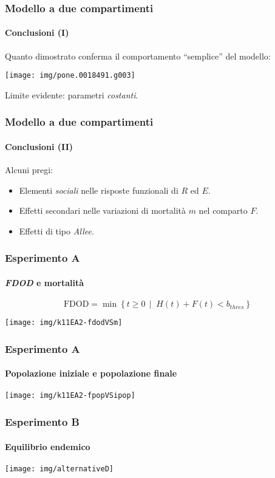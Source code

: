 \documentclass[]{beamer} %
\newcommand{\st}{\,\mid\;}
\begin{document}
\begin{frame}
    \frametitle{Modello a due compartimenti}
    \framesubtitle{Conclusioni (I)}

    Quanto dimostrato conferma il comportamento ``semplice'' del modello:
    \begin{center}
        \texttt{[image: img/pone.0018491.g003]}
    \end{center}

    \pause
    Limite evidente: parametri \emph{costanti}.
\end{frame}

\begin{frame}
    \frametitle{Modello a due compartimenti}
    \framesubtitle{Conclusioni (II)}

    Alcuni pregi:
    \begin{itemize}
        \item \pause Elementi \emph{sociali} nelle risposte funzionali di $R$ ed $E$.
        \item \pause Effetti secondari nelle variazioni di mortalità $m$ nel comparto $F$.
        \item \pause Effetti di tipo \emph{Allee}.
    \end{itemize}
\end{frame}


\begin{frame}
    \frametitle{Esperimento A}
    \framesubtitle{\emph{FDOD} e mortalità}

    $$\text{FDOD} = \min \left\{ t \geq 0 \st H(t) + F(t) < b_{thres} \right\}$$

    \pause
    \begin{center}
        \texttt{[image: img/k11EA2-fdodVSm]}
    \end{center}
\end{frame}

\begin{frame}
    \frametitle{Esperimento A}
    \framesubtitle{Popolazione iniziale e popolazione finale}

    \begin{center}
        \texttt{[image: img/k11EA2-fpopVSipop]}
    \end{center}
\end{frame}

\begin{frame}
    \frametitle{Esperimento B}
    \framesubtitle{Equilibrio endemico}

    \begin{center}
        \texttt{[image: img/alternativeD]}
    \end{center}
\end{frame}
\end{document}
